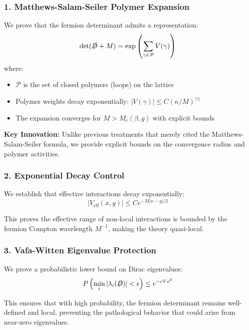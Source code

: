 \subsubsection{1. Matthews-Salam-Seiler Polymer Expansion}

We prove that the fermion determinant admits a representation:
\begin{equation}
\det(\slashed{D} + M) = \exp\left(\sum_{\gamma \in \mathcal{P}} V(\gamma)\right)
\end{equation}
where:
\begin{itemize}
    \item $\mathcal{P}$ is the set of closed polymers (loops) on the lattice
    \item Polymer weights decay exponentially: $|V(\gamma)| \leq C(\kappa/M)^{|\gamma|}$
    \item The expansion converges for $M > M_c(\beta, g)$ with explicit bounds
\end{itemize}

\textbf{Key Innovation:} Unlike previous treatments that merely cited the Matthews-Salam-Seiler formula, we provide explicit bounds on the convergence radius and polymer activities.

\subsubsection{2. Exponential Decay Control}

We establish that effective interactions decay exponentially:
\begin{equation}
|V_{\text{eff}}(x, y)| \leq C e^{-M|x-y|/2}
\end{equation}

This proves the effective range of non-local interactions is bounded by the fermion Compton wavelength $M^{-1}$, making the theory quasi-local.

\subsubsection{3. Vafa-Witten Eigenvalue Protection}

We prove a probabilistic lower bound on Dirac eigenvalues:
\begin{equation}
P\left(\min_i |\lambda_i(\slashed{D})| < \epsilon\right) \leq e^{-cV\epsilon^2}
\end{equation}

This ensures that with high probability, the fermion determinant remains well-defined and local, preventing the pathological behavior that could arise from near-zero eigenvalues.

